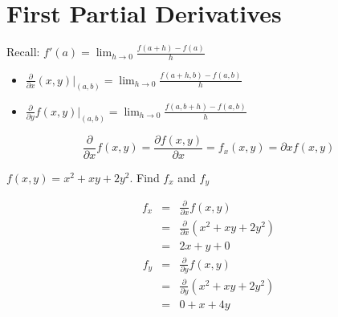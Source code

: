 \section{First Partial Derivatives}
Recall: \(\displaystyle f'(a) = \lim_{h \to 0} \frac{f(a + h) - f(a)}{h}\)
\begin{itemize}
\item \(\displaystyle \frac{\partial}{\partial x} (x, y)\Big|_{(a, b)} = \lim_{h \to 0} \frac{f(a + h, b) - f(a, b)}{h}\)
\item \( \displaystyle \frac{\partial}{\partial y} f(x, y) \Big|_{(a, b)} = \lim_{h \to 0} \frac{f(a, b+h) - f(a, b)}{h}\)
\end{itemize}
\begin{notn}
\[\displaystyle \frac{\partial}{\partial x} f(x, y) = \frac{\partial f(x, y)}{\partial x} = f_x (x, y) = \partial x f(x, y)\]
\end{notn}
\begin{eg}
\(f(x, y) = x^2 + xy + 2y^2\). Find \(f_x\) and \(f_y\)

\soln
\[\begin{array}{rcl}
f_x & = & \displaystyle \frac{\partial}{\partial x} f(x, y)\\
& = & \displaystyle \frac{\partial}{\partial x} (x^2 + xy + 2y^2)\\
& = & 2x + y + 0
\end{array}\]
\[\begin{array}{rcl}
f_y & = & \displaystyle \frac{\partial}{\partial y} f(x, y)\\
& = & \displaystyle \frac{\partial}{\partial y} (x^2 + xy +2y^2)\\
& = & 0 + x + 4y
\end{array}\]
\end{eg}

